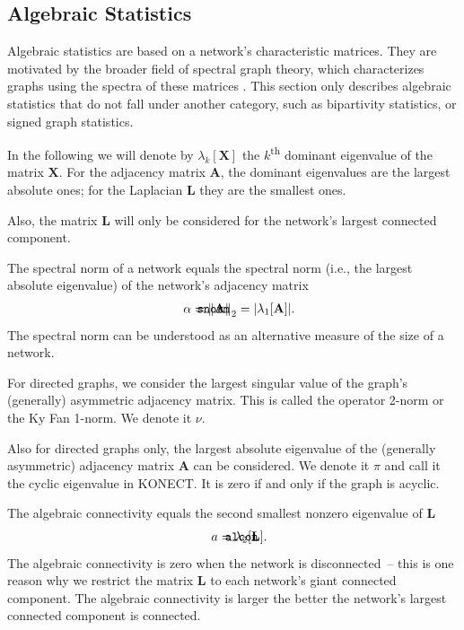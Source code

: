 \documentclass{article}
\def\mathnote#1{%
  \tag*{\rlap{\hspace\marginparsep\smash{\parbox[t]{\marginparwidth}{#1}}}}
}
\begin{document}
\subsection{Algebraic Statistics}
Algebraic statistics are based on a network's characteristic matrices.
They are motivated by the broader field of spectral graph theory, which
characterizes graphs using the spectra of these matrices \citep{b285}.
This section only describes algebraic statistics that do not fall under
another category, such as bipartivity statistics, or signed graph
statistics. 

In the following we will denote by $\lambda_k[\mathbf X]$ the
$k$\textsuperscript{th} dominant eigenvalue of the matrix $\mathbf X$.
For the adjacency matrix $\mathbf A$, the dominant eigenvalues are the
largest absolute ones; for the Laplacian $\mathbf L$ they are the
smallest ones.

Also, the matrix $\mathbf L$ will only be considered for the network's
largest connected component.

The spectral norm of a network equals the spectral norm (i.e., the
largest absolute eigenvalue) of the network's adjacency matrix
\begin{align}
  \mathnote{\texttt{snorm}} 
  \alpha &= 
  \left\| \mathbf A \right\|_2 = 
  | \lambda_1[\mathbf A] | .
\end{align}
The spectral norm can be understood as an alternative measure of the
size of a network.

For directed graphs, we consider the largest singular value of the
graph's (generally) asymmetric adjacency matrix.  This is called the
operator 2-norm or the Ky Fan 1-norm.  We denote it $\nu$.

Also for directed graphs only, the largest absolute eigenvalue of the
(generally asymmetric) adjacency matrix $\mathbf A$ can be considered.  
We denote it $\pi$ and call it the cyclic eigenvalue in KONECT.  It is zero if and
only if the graph is acyclic. 

The algebraic connectivity equals the second smallest nonzero eigenvalue
of $\mathbf L$ \citep{b652}
\begin{align}
  \mathnote{\texttt{alcon}} a &= \lambda_2[\mathbf L].
\end{align}
The algebraic connectivity is zero when the network is disconnected~--
this is one reason why we restrict the matrix $\mathbf L$ to each
network's giant connected component.  The algebraic connectivity is
larger the better the network's largest connected component is
connected.
\end{document}
